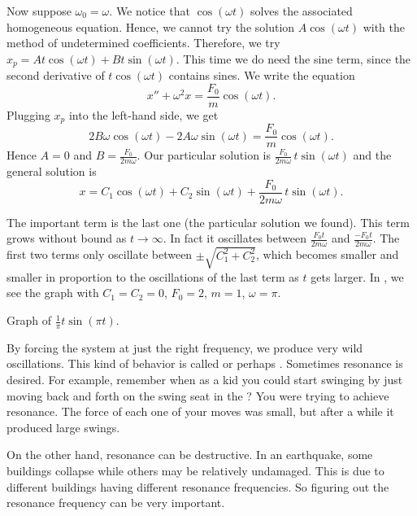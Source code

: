 Now suppose $\omega_0 = \omega$.
We notice that $\cos (\omega t)$ solves the associated
homogeneous equation.
Hence, we cannot try
the solution $A \cos (\omega t)$ with the method of undetermined
coefficients.
Therefore, we 
try $x_p = A t \cos (\omega t) + B t \sin (\omega t)$.
This time we do need the sine
term, since the second derivative of $t \cos (\omega t)$ contains sines.
We write the equation
\begin{equation*}
x'' + \omega^2 x = \frac{F_0}{m} \cos ( \omega t) .
\end{equation*}
Plugging $x_p$ into the left-hand side, we get
\begin{equation*}
2 B \omega \cos (\omega t) - 2 A \omega \sin (\omega t) = 
\frac{F_0}{m} \cos (\omega t) .
\end{equation*}
Hence $A = 0$ and $B = \frac{F_0}{2m\omega}$.  Our particular solution is
$\frac{F_0}{2m\omega} \, t \sin (\omega t)$ and the general solution is
\begin{equation*}
x = C_1 \cos (\omega t) + C_2 \sin (\omega t)
+ \frac{F_0}{2m\omega} \, t \sin (\omega t) .
\end{equation*}

The important term is the last one (the particular solution we found).  
This term grows without bound as $t \to \infty$.  In fact it
oscillates 
between $\frac{F_0 t}{2m\omega}$ and
$\frac{- F_0 t}{2m\omega}$.  The first two terms only oscillate between
$\pm\sqrt{C_1^2 + C_2^2}$, which becomes smaller and smaller in proportion to
the oscillations of the last term as $t$ gets larger.  In
, we see the graph with $C_1=C_2=0$, $F_0 = 2$,
$m=1$, $\omega = \pi$.

\begin{mywrapfig}{3.25in}
\capstart
{}
\caption{Graph of
$\frac{1}{\pi} t \sin (\pi t)$.\label{3.6:resonancefig}}
\end{mywrapfig}

By forcing the system at just the right frequency, we produce very wild
oscillations.  This kind of behavior is called \emph{} or
perhaps
\emph{}.  Sometimes resonance is
desired.  For
example, remember when as a kid you could start swinging by just moving back
and forth on the swing seat in the ?  You were trying to
achieve resonance.  The force of each one of your moves was small, but after a
while it produced large swings.

On the other hand, resonance can be destructive.
In an earthquake, some buildings collapse while
others may be relatively undamaged.  This is due to different buildings
having different resonance frequencies.  So figuring out the resonance
frequency can be very important.

